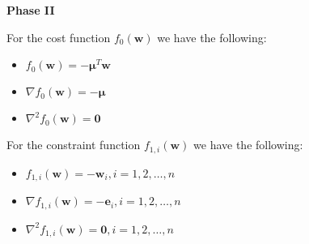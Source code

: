\documentclass{beamer}
\begin{document}
\begin{frame}

\textbf{Phase II}

\vspace{0.8cm}
\justifying

\justifying
For the cost function $f_{0}\left(\mathbf{w}\right)$ we have the following:
\begin{itemize}
	\item $f_{0}\left(\mathbf{w}\right) = - \boldsymbol\mu^{T} \mathbf{w}$
	\item $\nabla f_{0}\left(\mathbf{w}\right) = - \boldsymbol\mu$
	\item $\nabla^{2}f_{0}\left(\mathbf{w}\right) = \mathbf{0}$
\end{itemize}

\vspace{0.8cm}
\justifying
For the constraint function $f_{1,i}\left(\mathbf{w}\right)$ we have the following:
\begin{itemize}
	\item $f_{1,i}\left(\mathbf{w}\right) = - \mathbf{w}_{i}, i=1,2,\dots,n$
	\item $\nabla f_{1,i}\left(\mathbf{w}\right) = - \mathbf{e}_{i}, i=1,2,\dots,n$
	\item $\nabla^{2}f_{1,i}\left(\mathbf{w}\right) = \mathbf{0}, i=1,2,\dots,n$
\end{itemize}

\end{frame}
\end{document}
